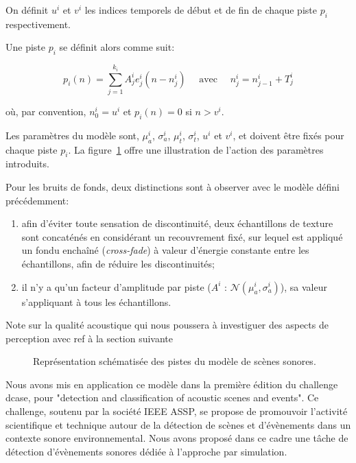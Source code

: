   On définit $u^i$ et $v^i$ les indices temporels de début et de fin de chaque piste $p_i$ respectivement.

  Une piste $p_i$ se définit alors comme suit:

  \begin{equation}
  \label{eq:ch4_eq2}
  p_{i}(n)= \sum_{j=1}^{k_i} A_j^i e_j^i(n-n_j^i) \quad \textrm{ avec } \quad n_j^i=n_{j-1}^i + T_j^i
  \end{equation}

  où, par convention, $n^i_0=u^i$ et $p_i(n)=0$ si $n>v^i$.

  Les paramètres du modèle sont, $\mu_a^i$, $\sigma_a^i$, $\mu_t^i$, $\sigma_t^i$, $u^i$ et $v^i$, et doivent être fixés pour chaque piste $p_i$. La figure~\ref{fig:modelSequence} offre une illustration de l'action des paramètres introduits.

  Pour les bruits de fonds, deux distinctions sont à observer avec le modèle défini précédemment:

  \begin{enumerate}
  \item afin d'éviter toute sensation de discontinuité, deux échantillons de texture sont concaténés en considérant un recouvrement fixé, sur lequel est appliqué un fondu enchaîné (\emph{cross-fade}) à valeur d'énergie constante entre les échantillons, afin de réduire les discontinuités;
  \item il n'y a qu'un facteur d'amplitude par piste ($A^i \textrm{ : } \mathcal{N}(\mu_a^{i},\sigma_a^{i})$), sa valeur s'appliquant à tous les échantillons.
  \end{enumerate}

  Note sur la qualité acoustique qui nous poussera à investiguer des aspects de perception avec ref à la section suivante

  \begin{figure}[t]
          \def\svgwidth{\linewidth}
          
         \caption{Représentation schématisée des pistes du modèle de scènes sonores.}\label{fig:modelSequence}
  \end{figure}

  Nous avons mis en application ce modèle dans la première édition du challenge dcase, pour "detection and classification of acoustic scenes and events". Ce challenge, soutenu par la société IEEE ASSP, se propose de promouvoir l'activité scientifique et technique autour de la détection de scènes et d'évènements dans un contexte sonore environnemental\cite{stowellhal-01253912}. Nous avons proposé dans ce cadre une tâche de détection d'évènements sonores dédiée à l'approche par simulation.

